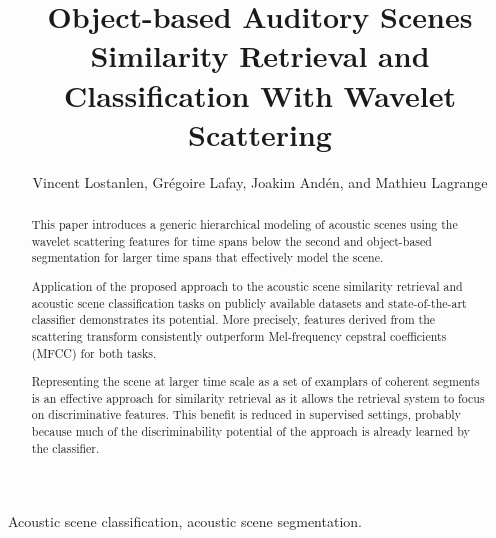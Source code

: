 \documentclass[journal]{IEEEtran}
\begin{document}
%
\title{Object-based Auditory Scenes Similarity Retrieval and Classification With Wavelet Scattering}

\author{Vincent Lostanlen, Gr\'egoire Lafay, Joakim And\'en, and Mathieu Lagrange}


\maketitle

\begin{abstract}

This paper introduces a generic hierarchical modeling of acoustic scenes using the wavelet scattering features for time spans below the second and object-based segmentation for larger time spans that effectively model the scene. 

Application of the proposed approach to the acoustic scene similarity retrieval and acoustic scene classification tasks on publicly available datasets and state-of-the-art classifier demonstrates its potential. More precisely, features derived from the scattering transform consistently outperform Mel-frequency cepstral coefficients (MFCC) for both tasks. 

Representing the scene at larger time scale as a set of examplars of coherent segments is an effective approach for similarity retrieval as it allows the retrieval system to focus on discriminative features. This benefit is reduced in supervised settings, probably because much of the discriminability potential of the approach is already learned by the classifier.

\end{abstract}

\begin{IEEEkeywords}
Acoustic scene classification, acoustic scene segmentation.
\end{IEEEkeywords}

%
\IEEEpeerreviewmaketitle
\end{document}
